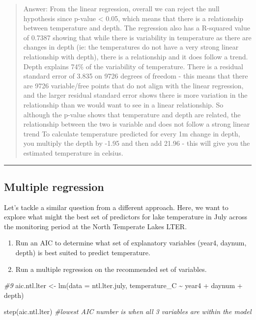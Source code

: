 \documentclass[
]{article}
\newenvironment{Shaded}{\begin{snugshade}}{\end{snugshade}}
\newcommand{\AttributeTok}[1]{\textcolor[rgb]{0.77,0.63,0.00}{#1}}
\newcommand{\CommentTok}[1]{\textcolor[rgb]{0.56,0.35,0.01}{\textit{#1}}}
\newcommand{\FunctionTok}[1]{\textcolor[rgb]{0.00,0.00,0.00}{#1}}
\newcommand{\NormalTok}[1]{#1}
\newcommand{\OtherTok}[1]{\textcolor[rgb]{0.56,0.35,0.01}{#1}}
\newcommand{\SpecialCharTok}[1]{\textcolor[rgb]{0.00,0.00,0.00}{#1}}
\begin{document}
\begin{quote}
Answer: From the linear regression, overall we can reject the null
hypothesis since p-value \textless{} 0.05, which means that there is a
relationship between temperature and depth. The regression also has a
R-squared value of 0.7387 showing that while there is variability in
temperature as there are changes in depth (ie: the temperatures do not
have a very strong linear relationship with depth), there is a
relationship and it does follow a trend. Depth explains 74\% of the
variability of temperature. There is a residual standard error of 3.835
on 9726 degrees of freedom - this means that there are 9726
variable/free points that do not align with the linear regression, and
the larger residual standard error shows there is more variation in the
relationship than we would want to see in a linear relationship. So
although the p-value shows that temperature and depth are related, the
relationship between the two is variable and does not follow a strong
linear trend To calculate temperature predicted for every 1m change in
depth, you multiply the depth by -1.95 and then add 21.96 - this will
give you the estimated temperature in celsius.
\end{quote}

\begin{center}\rule{0.5\linewidth}{0.5pt}\end{center}

\hypertarget{multiple-regression}{%
\subsection{Multiple regression}\label{multiple-regression}}

Let's tackle a similar question from a different approach. Here, we want
to explore what might the best set of predictors for lake temperature in
July across the monitoring period at the North Temperate Lakes LTER.

\begin{enumerate}
\def\labelenumi{\arabic{enumi}.}
\setcounter{enumi}{8}
\item
  Run an AIC to determine what set of explanatory variables (year4,
  daynum, depth) is best suited to predict temperature.
\item
  Run a multiple regression on the recommended set of variables.
\end{enumerate}

\begin{Shaded}
\begin{Highlighting}[]
\CommentTok{\#9}
\NormalTok{aic.ntl.lter }\OtherTok{\textless{}{-}} \FunctionTok{lm}\NormalTok{(}\AttributeTok{data =}\NormalTok{ ntl.lter.july, }
\NormalTok{                   temperature\_C }\SpecialCharTok{\textasciitilde{}}\NormalTok{ year4 }\SpecialCharTok{+}\NormalTok{ daynum }\SpecialCharTok{+}\NormalTok{ depth)}

\FunctionTok{step}\NormalTok{(aic.ntl.lter) }\CommentTok{\#lowest AIC number is when all 3 variables are within the model}
\end{Highlighting}
\end{Shaded}
\end{document}
